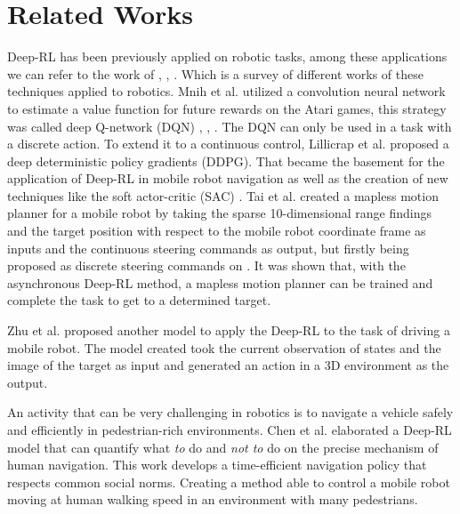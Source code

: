 \section{Related Works}

Deep-RL has been previously applied on robotic tasks, among these applications we can refer to the work of \cite{kober2013reinforcement}, \cite{stone2005reinforcement}, \cite{tobin2017domain}.
Which is a survey of different works of these techniques applied to robotics.
Mnih et al. \cite{mnih2013playing} utilized a convolution neural network to estimate a value function for future rewards on the Atari games, this strategy was called deep Q-network (DQN) \cite{mnih2013playing}, \cite{hausknecht2015deep}, \cite{van2016deep}.
The DQN can only be used in a task with a discrete action.
To extend it to a continuous control, Lillicrap et al. \cite{lillicrap2015continuous} proposed a deep deterministic policy gradients (DDPG).
That became the basement for the application of Deep-RL in mobile robot navigation as well as the creation of new techniques like the soft actor-critic (SAC) \cite{haarnoja2018soft}.
Tai et al. \cite{tai2017virtual} created a mapless motion planner for a mobile robot by taking the sparse 10-dimensional range findings and the target position with respect to the mobile robot coordinate frame as inputs and the continuous steering commands as output, but firstly being proposed as discrete steering commands on \cite{tai2016towards}. It was shown that, with the asynchronous Deep-RL method, a mapless motion planner can be trained and complete the task to get to a determined target. 

Zhu et al. \cite{zhu2017target} proposed another model to apply the Deep-RL to the task of driving a mobile robot.
The model created took the current observation of states and the image of the target as input and generated an action in a 3D environment as the output.

An activity that can be very challenging in robotics is to navigate a vehicle safely and efficiently in pedestrian-rich environments. Chen et al. \cite{chen2017socially} elaborated a Deep-RL model that can quantify what \textit{to} do and \textit{not to} do on the precise mechanism of human  navigation.
This work develops a time-efficient navigation policy that respects common social norms.
Creating a method able to control a mobile robot moving at human walking speed in an environment with many pedestrians.
